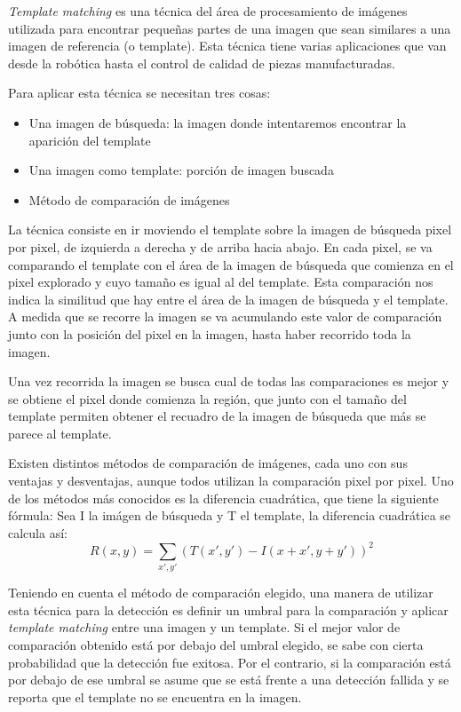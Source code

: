 \textit{Template matching} es una técnica del área de procesamiento de imágenes utilizada para encontrar pequeñas partes de una imagen que sean similares a una imagen de referencia (o template). Esta técnica tiene varias aplicaciones que van desde la robótica hasta el control de calidad de piezas manufacturadas.

Para aplicar esta técnica se necesitan tres cosas:
\begin{itemize}
	\item Una imagen de búsqueda: la imagen donde intentaremos encontrar la aparición del template
	\item Una imagen como template: porción de imagen buscada
	\item Método de comparación de imágenes
\end{itemize}

La técnica consiste en ir moviendo el template sobre la imagen de búsqueda pixel por pixel, de izquierda a derecha y de arriba hacia abajo. En cada pixel, se va comparando el template con el área de la imagen de búsqueda que comienza en el pixel explorado y cuyo tamaño es igual al del template. Esta comparación nos indica la similitud que hay entre el área de la imagen de búsqueda y el template. A medida que se recorre la imagen se va acumulando este valor de comparación junto con la posición del pixel en la imagen, hasta haber recorrido toda la imagen.

Una vez recorrida la imagen se busca cual de todas las comparaciones es mejor y se obtiene el pixel donde comienza la región, que junto con el tamaño del template permiten obtener el recuadro de la imagen de búsqueda que más se parece al template.

Existen distintos métodos de comparación de imágenes, cada uno con sus ventajas y desventajas, aunque todos utilizan la comparación pixel por pixel. Uno de los métodos más conocidos es la diferencia cuadrática, que tiene la siguiente fórmula: Sea I la imágen de búsqueda y T el template, la diferencia cuadrática se calcula así:
\begin{equation}\label{eq:diferencia_cuadratica}
R(x, y) = \displaystyle\sum\limits_{x', y'} (T(x', y') - I(x + x', y + y'))^2
\end{equation}

Teniendo en cuenta el método de comparación elegido, una manera de utilizar esta técnica para la detección es definir un umbral para la comparación y aplicar \textit{template matching} entre una imagen y un template. Si el mejor valor de comparación obtenido está por debajo del umbral elegido, se sabe con cierta probabilidad que la detección fue exitosa. Por el contrario, si la comparación está por debajo de ese umbral se asume que se está frente a una detección fallida y se reporta que el template no se encuentra en la imagen.


